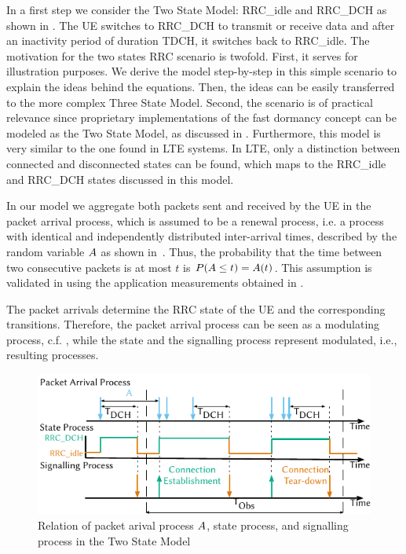 In a first step we consider the Two State Model: \gls{RRC_idle} and \gls{RRC_DCH} as shown in .
The \gls{UE} switches to \gls{RRC_DCH} to transmit or receive data and after an inactivity period of duration \gls{TDCH}, it switches back to \gls{RRC_idle}. 
The motivation for the two states \gls{RRC} scenario is twofold.
First, it serves for illustration purposes.
We derive the model step-by-step in this simple scenario to explain the ideas behind the equations.
Then, the ideas can be easily transferred to the more complex Three State Model.
Second, the scenario is of practical relevance since proprietary implementations of the fast dormancy concept can be modeled as the Two State Model, as discussed in .
Furthermore, this model is very similar to the one found in \gls{LTE} systems.
In \gls{LTE}, only a distinction between connected and disconnected states can be found, which maps to the \gls{RRC_idle} and \gls{RRC_DCH} states discussed in this model.

In our model we aggregate both packets sent and received by the \gls{UE} in the packet arrival process, which is assumed to be a renewal process, i.e. a process  with identical and independently distributed inter-arrival times, described by the random variable \(A\) as shown in~.
Thus, the probability that the time between two consecutive packets is at most \(t\) is \(P(A \leq t) = A(t)\).
This assumption is validated in  using the application measurements obtained in .

The packet arrivals determine the \gls{RRC} state of the \gls{UE} and the corresponding transitions. Therefore, the packet arrival process can be seen as a modulating process, c.f. \cite{TranGia1983,TranGia1988}, while the state and the signalling process represent modulated, i.e., resulting processes.

\begin{figure}
  \centering
  \includegraphics{network/performance_model/analytical_model/figures/arrival_process}
  \caption{Relation of packet arival process \(A\), state process, and signalling process in the Two State Model}
  \label{fig:network:performance_model:system_description:arrival_process}
\end{figure}

